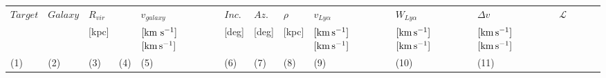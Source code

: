 \documentclass[twocolumn,tighten]{aastex6}
\newcommand{\kms}{$\rm [km\, s^{-1}]$} %
\providecommand{\DIFadd}[1]{{\protect\color{blue}\uwave{#1}}} %
\providecommand{\DIFdel}[1]{{\protect\color{red}\sout{#1}}}                      %
\providecommand{\DIFaddFL}[1]{\DIFadd{#1}} %
\providecommand{\DIFdelFL}[1]{\DIFdel{#1}} %
\providecommand{\DIFaddbeginFL}{} %
\providecommand{\DIFaddendFL}{} %
\providecommand{\DIFdelbeginFL}{} %
\providecommand{\DIFdelendFL}{} %
\begin{document}
\begin{table}[ht]\footnotesize
\begin{center}
\begin{tabular}{l l l l l l l l l l l l l l l}
 \hline \hline
 \DIFdelbeginFL \DIFdelFL{$Target$	}\DIFdelendFL \DIFaddbeginFL \DIFaddFL{$\rm Target$ }\DIFaddendFL & \DIFdelbeginFL \DIFdelFL{$Galaxy$  }\DIFdelendFL \DIFaddbeginFL \DIFaddFL{$\rm Galaxy$ }\DIFaddendFL & $R_{vir}$         & \DIFaddbeginFL \DIFaddFL{$\rm L/L_{\**}$ }& \DIFaddendFL $v_{galaxy}$    &  \DIFdelbeginFL \DIFdelFL{$Inc.$               }\DIFdelendFL \DIFaddbeginFL \DIFaddFL{$\rm Inc.$          }\DIFaddendFL &  \DIFdelbeginFL \DIFdelFL{$Az.$ 	       }\DIFdelendFL \DIFaddbeginFL \DIFaddFL{$\rm Az.$ 	     }\DIFaddendFL & $\rho$		& $v_{Ly\alpha}$	& $W_{Ly\alpha}$   & $\Delta v$  	     & $\mathcal{L}$  \\ 
  	   	     &                        & \scriptsize [kpc] &          	      \DIFaddbeginFL & \DIFaddendFL \scriptsize \DIFdelbeginFL \DIFdelFL{$\rm [km ~s^{-1}]$ }\DIFdelendFL \DIFaddbeginFL \kms \DIFaddendFL & \scriptsize [deg] & \scriptsize [deg] & \scriptsize [kpc] & \scriptsize \DIFdelbeginFL \DIFdelFL{$\rm [km\, s^{-1}]$ }\DIFdelendFL \DIFaddbeginFL \kms \DIFaddendFL & \scriptsize \DIFdelbeginFL \DIFdelFL{$\rm [km\, s^{-1}]$ }\DIFdelendFL \DIFaddbeginFL \kms \DIFaddendFL & \scriptsize \DIFdelbeginFL \DIFdelFL{$\rm [km\, s^{-1}]$ }\DIFdelendFL \DIFaddbeginFL \kms \DIFaddendFL & 		\\
\scriptsize (1) & \scriptsize (2) & \scriptsize (3) & \scriptsize (4) & \scriptsize (5)      & \scriptsize (6)     & \scriptsize  (7)   & \scriptsize (8)    & \scriptsize (9)        & \scriptsize (10)     & \scriptsize (11)    \DIFaddbeginFL & \scriptsize \DIFaddFL{(12) }\DIFaddendFL \\ \hline \hline


\end{tabular}
\end{center}
\end{table}
\end{document}
